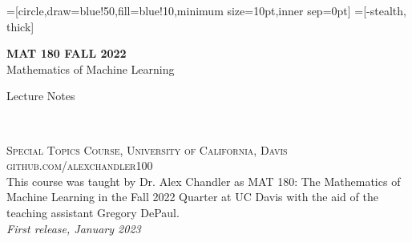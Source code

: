 \usetikzlibrary{positioning}
=[circle,draw=blue!50,fill=blue!10,minimum size=10pt,inner sep=0pt]
=[-stealth, thick]
\def\R{\mathbb{R}}



\begingroup
\thispagestyle{empty}
\centering
\vspace*{9cm}
\par\normalfont\fontsize{35}{35}\sffamily\selectfont
\textbf{MAT 180 FALL 2022}\\
{\LARGE Mathematics of Machine Learning}\par %
\vspace*{1cm}
{\Huge Lecture Notes}\par %
\endgroup


\newpage
~\vfill
\thispagestyle{empty}


\noindent \textsc{Special Topics Course, University of California, Davis}\\

\noindent \textsc{github.com/alexchandler100}\\ %

\noindent This course was taught by Dr. Alex Chandler as MAT 180: The Mathematics of Machine Learning in the Fall 2022 Quarter at UC Davis with the aid of the teaching assistant Gregory DePaul.\\ %

\noindent \textit{First release, January 2023} %



